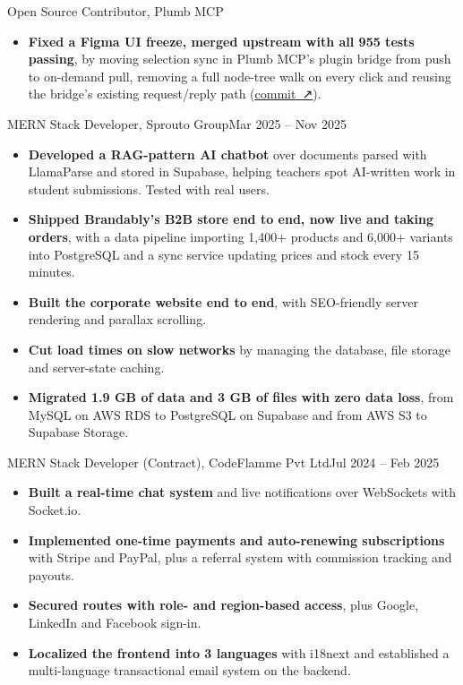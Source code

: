 \documentclass[a4paper]{article}
\newlength{\entryindent}    \setlength{\entryindent}{10pt}   %
\newlength{\markerwidth}    \setlength{\markerwidth}{3pt}    %
\newcommand{\extarrow}{{\arrowfont ↗}}
\newcommand{\jobmarker}{{\color{headgray}%
  \smash{\rule[-1pt]{\markerwidth}{\dimexpr\fontcharht\font`H+2pt\relax}}}}
\newcommand{\job}[3]{%
  \makebox[\entryindent][l]{\jobmarker}%
  {\semiboldfont\color{black}#1}, #2\hfill #3\par
}
\newcommand{\contribution}{\job}
\begin{document}
\contribution{Open Source Contributor}{Plumb MCP}{}
\begin{itemize}
  \item \textbf{Fixed a Figma UI freeze, merged upstream with all 955 tests passing}, by moving
        selection sync in Plumb MCP's plugin bridge from push to on-demand pull, removing a full
        node-tree walk on every click and reusing the bridge's existing request/reply path
        (\href{https://github.com/tathagatmaitray/plumb-mcp/commit/2ef8952}{\uline{commit\ \extarrow}}).
\end{itemize}

\job{MERN Stack Developer}{Sprouto Group}{Mar 2025 – Nov 2025}
\begin{itemize}
  \item \textbf{Developed a RAG-pattern AI chatbot} over documents parsed with LlamaParse and
        stored in Supabase, helping teachers spot AI-written work in student submissions.
        Tested with real users.
  \item \textbf{Shipped Brandably's B2B store end to end, now live and taking orders}, with a
        data pipeline importing 1,400+ products and 6,000+ variants into PostgreSQL and a sync
        service updating prices and stock every 15 minutes.
  \item \textbf{Built the corporate website end to end}, with SEO-friendly server rendering and
        parallax scrolling.
  \item \textbf{Cut load times on slow networks} by managing the database, file storage and
        server-state caching.
  \item \textbf{Migrated 1.9 GB of data and 3 GB of files with zero data loss}, from MySQL on
        AWS RDS to PostgreSQL on Supabase and from AWS S3 to Supabase Storage.
\end{itemize}

\job{MERN Stack Developer (Contract)}{CodeFlamme Pvt Ltd}{Jul 2024 – Feb 2025}
\begin{itemize}
  \item \textbf{Built a real-time chat system} and live notifications over WebSockets with
        Socket.io.
  \item \textbf{Implemented one-time payments and auto-renewing subscriptions} with Stripe and
        PayPal, plus a referral system with commission tracking and payouts.
  \item \textbf{Secured routes with role- and region-based access}, plus Google, LinkedIn and
        Facebook sign-in.
  \item \textbf{Localized the frontend into 3 languages} with i18next and established a
        multi-language transactional email system on the backend.
\end{itemize}
\end{document}
